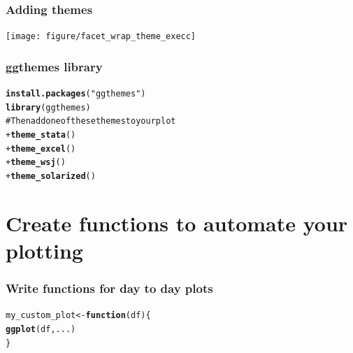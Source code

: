 \documentclass{beamer}\usepackage{graphicx, color}
\makeatletter
\newcommand{\hlfunctioncall}[1]{\textcolor[rgb]{0.501960784313725,0,0.329411764705882}{\textbf{#1}}}%
\newcommand{\hlstring}[1]{\textcolor[rgb]{0.6,0.6,1}{#1}}%
\newcommand{\hlcomment}[1]{\textcolor[rgb]{0.180392156862745,0.6,0.341176470588235}{#1}}%
\newenvironment{kframe}{%
 \def\at@end@of@kframe{}%
 \ifinner\ifhmode%
  \def\at@end@of@kframe{\end{minipage}}%
  \begin{minipage}{\columnwidth}%
 \fi\fi%
 \def\FrameCommand##1{\hskip\@totalleftmargin \hskip-\fboxsep
 \colorbox{shadecolor}{##1}\hskip-\fboxsep
     \hskip-\linewidth \hskip-\@totalleftmargin \hskip\columnwidth}%
 \MakeFramed {\advance\hsize-\width
   \@totalleftmargin\z@ \linewidth\hsize
   \@setminipage}}%
 {\par\unskip\endMakeFramed%
 \at@end@of@kframe}
\newenvironment{knitrout}{}{} %
\makeatother
\begin{document}
\begin{frame}[fragile]
\frametitle{Adding themes}
\begin{knitrout}\footnotesize
{}\color{fgcolor}
\texttt{[image: figure/facet\_wrap\_theme\_execc]} 

\end{knitrout}

\end{frame}

\begin{frame}[fragile]
\frametitle{ggthemes library}
\begin{knitrout}\footnotesize
{}\color{fgcolor}\begin{kframe}
\begin{alltt}
\hlfunctioncall{install.packages}(\hlstring{"ggthemes"})
\hlfunctioncall{library}(ggthemes)
\hlcomment{# Then add one of these themes to your plot}
+\hlfunctioncall{theme_stata}()
+\hlfunctioncall{theme_excel}()
+\hlfunctioncall{theme_wsj}()
+\hlfunctioncall{theme_solarized}()
\end{alltt}
\end{kframe}
\end{knitrout}

\end{frame}


\section*{Create functions to automate your plotting}
\frame{\sectionpage}

\begin{frame}[fragile]
\frametitle{Write functions for day to day plots}
\begin{knitrout}\footnotesize
{}\color{fgcolor}\begin{kframe}
\begin{alltt}
my_custom_plot <- \hlfunctioncall{function}(df) \{
    \hlfunctioncall{ggplot}(df, ...)
\}
\end{alltt}
\end{kframe}
\end{knitrout}

\end{frame}
\end{document}
